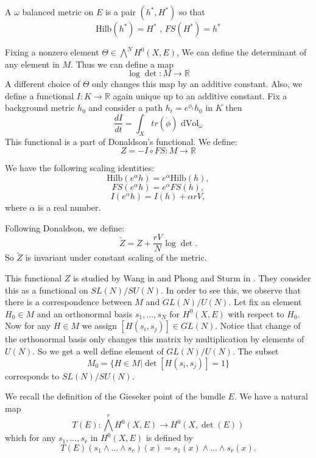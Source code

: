 \documentclass[12pt,oneside,notitlepage]{amsart}
\theoremstyle{definition}
\theoremstyle{remark}
\numberwithin{equation}{section}
\begin{document}
 \begin{Def}

A $\omega$ balanced metric on $E$ is a pair $(h^*,H^*)$ so that
$$\textrm{Hilb}(h^*)=H^*  \textrm{    ,    }   FS(H^*)=h^*$$

 \end{Def}

 Fixing a nonzero element $\Theta \in \bigwedge^N H^{0}(X,E)$,
 We can define the determinant of any element in $M$. Thus we
 can define a map $$\log \det: M\rightarrow \mathbb{R}$$
 A different choice of $\Theta$ only changes this map by an additive
 constant.
 Also, we define a functional $I:K\rightarrow \mathbb{R}$ again
 unique up to an additive constant. Fix a background metric
 $h_{0}$ and consider a path $h_{t}=e^{\phi_{t}}h_{0}$ in $K$
 then \begin{equation}\label{eq1}\frac{dI}{dt}=\int_{X} tr(\dot{\phi}) \textrm{   dVol}_{\omega}\end{equation}
 This functional is a part of Donaldson's functional.
 We define: \begin{equation}\label{eq2} Z=-I \circ FS:M\rightarrow \mathbb{R}\end{equation}

 We have the following scaling identities:
 $$\textrm{Hilb}(e^{\alpha}h)=e^{\alpha} \textrm{Hilb}(h),$$
 $$ FS(e^{\alpha}h)=e^{\alpha} FS(h),$$
 $$I(e^{\alpha}h)=I(h)+\alpha rV  ,$$
 where $\alpha$ is a real number.

Following Donaldson, we define:
\begin{equation}\label{eq3}\widetilde{Z}=Z+\frac{rV}{N}\log\det.\end{equation} So
$\widetilde{Z}$ is invariant under constant scaling of the metric.

This functional $Z$ is studied by Wang in \cite{W} and Phong and
Sturm in \cite{PS}. They consider this as a functional on
$SL(N)/SU(N)$. In order to see this, we observe that there is a
correspondence between $M$ and $GL(N)/U(N)$. Let fix an element
$H_{0} \in M$ and an orthonormal basis $s_{1},...,s_{N}$ for
$H^{0}(X,E)$ with respect to $H_{0}$. Now for any $H \in M$ we
assign $[H(s_{i},s_{j})] \in GL(N)$. Notice that change of the
orthonormal basis only changes this matrix by multiplication by
elements of $U(N)$. So we get a well define element of
$GL(N)/U(N)$. The subset $$M_{0}=\{H \in M | \det [H(s_{i},
s_{j})]=1\}$$ corresponds to $SL(N)/SU(N)$.

We recall the definition of the Gieseker point of the bundle $E$.
We have a natural map
$$T(E): \bigwedge^{ r}H^{0}(X,E)\rightarrow H^{0}(X,\det(E))$$ which
for any $s_{1},..., s_{r}$ in $H^{0}(X,E)$ is defined by
$$T(E)(s_{1}\wedge...\wedge s_{r})(x)=s_{1}(x)\wedge...\wedge s_{r}(x).$$
\end{document}
